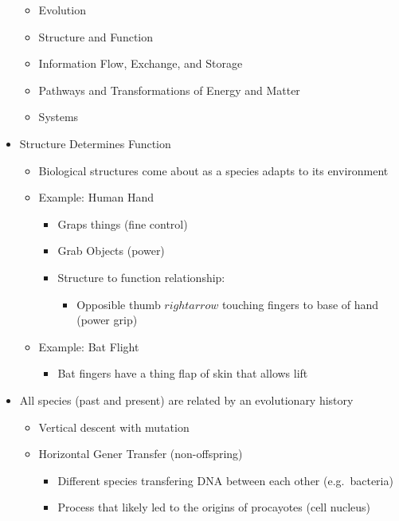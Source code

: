 \documentclass[12pt]{article}
\begin{document}
\begin{itemize}
\begin{itemize}
            \item Evolution
            \item Structure and Function
            \item Information Flow, Exchange, and Storage
            \item Pathways and Transformations of Energy and Matter
            \item Systems
        \end{itemize}
        \item Structure Determines Function
        \begin{itemize}
            \item Biological structures come about as a species adapts to its environment
            \item Example: Human Hand
            \begin{itemize}
                \item Graps things (fine control)
                \item Grab Objects (power)
                \item Structure to function relationship:
                \begin{itemize}
                    \item Opposible thumb $rightarrow$ touching fingers to base of hand (power grip)
                \end{itemize}
            \end{itemize}
            \item Example: Bat Flight
            \begin{itemize}
                \item Bat fingers have a thing flap of skin that allows lift
            \end{itemize}
        \end{itemize}
        \item All species (past and present) are related by an evolutionary history
        \begin{itemize}
            \item Vertical descent with mutation
            \item Horizontal Gener Transfer (non-offspring)
            \begin{itemize}
                \item Different species transfering DNA between each other (e.g.\ bacteria)
                \item Process that likely led to the origins of procayotes (cell nucleus)

\end{itemize}
\end{itemize}
\end{itemize}
\end{document}
